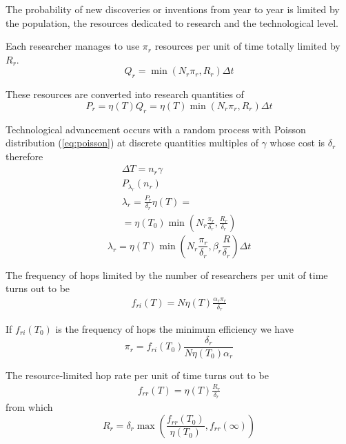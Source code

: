 \documentclass[a4paper,twoside]{article}
\begin{document}
The probability of new discoveries or inventions from year to year is limited by the population, the resources dedicated to research and the technological level.

Each researcher manages to use $ \pi_r $ resources per unit of time totally limited by $ R_r $.
\begin{equation*}
	Q_r = \min(N_r \pi_r, R_r) \Delta t
\end{equation*}

These resources are converted into research quantities of
\begin{equation*}
	P_r = \eta(T) Q_r = \eta(T) \min(N_r \pi_r, R_r) \Delta t
\end{equation*}

Technological advancement occurs with a random process with Poisson distribution (\ref{eq:poisson}) at discrete quantities multiples of $ \gamma $ whose cost is $ \delta_r $ therefore
\begin{eqnarray*}
	\Delta T = n_r \gamma
	\\
	P_{\lambda_r}(n_r)
	\\
	\lambda_r = \frac{P_r}{\delta_r}\eta(T)=
	\\
	= \eta(T_0) \min \left( N_r \frac{\pi_r}{\delta_r}, \frac{R_r}{\delta_r} \right)
\end{eqnarray*}
\begin{equation}\label{eq:research}
	\lambda_r = \eta(T) \min \left( N_r \frac{\pi_r}{\delta_r}, \beta_r \frac{R}{\delta_r} \right) \Delta t
\end{equation}

The frequency of hops limited by the number of researchers per unit of time turns out to be
\begin{align*}
	f_{ri}(T) = N \eta(T) \frac{\alpha_r \pi_r}{\delta_r}
\end{align*}

If $ f_{ri}(T_0) $ is the frequency of hops the minimum efficiency we have
\begin{equation}\label{eq:pir}
	\pi_r = f_{ri}(T_0) \frac{\delta_r}{N \eta(T_0) \alpha_r}
\end{equation}

The resource-limited hop rate per unit of time turns out to be
\begin{align*}
	f_{rr}(T) = \eta(T) \frac{R_r}{\delta_r}
\end{align*}
from which
\begin{equation}\label{eq:Rr}
	R_r = \delta_r \max \left( \frac{f_{rr}(T_0)}{\eta(T_0)}, f_{rr}(\infty) \right)
\end{equation}
\end{document}
